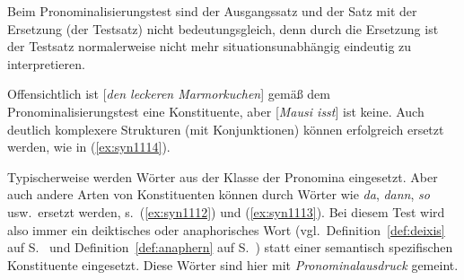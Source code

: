 

Beim Pronominalisierungstest sind der Ausgangssatz und der Satz mit der Ersetzung (der Testsatz) nicht bedeutungsgleich, denn durch die Ersetzung ist der Testsatz normalerweise nicht mehr situationsunabhängig eindeutig zu interpretieren.

\begin{exe}
  \ex\label{ex:syn1111}
  \begin{xlist}
  \end{xlist}
\end{exe}

Offensichtlich ist [\textit{den leckeren Marmorkuchen}] gemäß dem Pronominalisierungstest eine Konstituente, aber [\textit{Mausi isst}] ist keine.
Auch deutlich komplexere Strukturen (\zB mit Konjunktionen) können erfolgreich ersetzt werden, wie in (\ref{ex:syn1114}).

\begin{exe}
\end{exe}

Typischerweise werden Wörter aus der Klasse der Pronomina eingesetzt.
Aber auch andere Arten von Konstituenten können durch Wörter wie \textit{da}, \textit{dann}, \textit{so} usw.\ ersetzt werden, s.\ (\ref{ex:syn1112}) und (\ref{ex:syn1113}).
Bei diesem Test wird also immer ein deiktisches oder anaphorisches Wort (vgl.\ Definition~\ref{def:deixis} auf S.~\pageref{def:deixis} und Definition~\ref{def:anaphern} auf S.~\pageref{def:anaphern}) statt einer semantisch spezifischen Konstituente eingesetzt.
Diese Wörter sind hier mit \textit{Pronominalausdruck} gemeint.

\begin{exe}
\end{exe}

